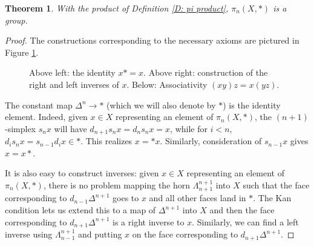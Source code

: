 \documentclass[12pt]{article}
\theoremstyle{plain}
\newtheorem{theorem}{Theorem}[section]
\theoremstyle{definition}
\theoremstyle{remark}
\begin{document}
\begin{theorem}
With the product of Definition \ref{D: pi product}, $\pi_n(X,*)$ is a group. 
\end{theorem}
\begin{proof}
The constructions corresponding to the necessary axioms are pictured in Figure \ref{F: fig27}.


\begin{figure}[!htp]
\begin{center}
\end{center}
\caption{Above left: the identity $x*=x$. Above right: construction of the right and left inverses of $x$. Below: Associativity $(xy)z=x(yz)$.}\label{F: fig27}
\end{figure}

The constant map $\Delta^n\to *$ (which we will also denote by $*$) is the identity element. Indeed, given $x\in X$ representing an element of $\pi_n(X,*)$, the $(n+1)$-simplex $s_{n}x$ will have $d_{n+1}s_nx=d_ns_nx=x$, while for $i<n$, $d_is_nx=s_{n-1}d_ix\in *$. This realizes $x=*x$. Similarly, consideration of $s_{n-1}x$  gives $x=x*$. 


It is also easy to construct inverses:  given $x\in X$ representing an element of $\pi_n(X,*)$, there is no problem mapping the horn $\Lambda^{n+1}_{n+1}$ into $X$ such that the face corresponding to $d_{n-1}\Delta^{n+1}$ goes to $x$ and all other faces land in $*$. The Kan condition lets us extend this to a map of $\Delta^{n+1}$ into $X$ and then the face corresponding to $d_{n+1}\Delta^{n+1}$ is a right inverse to $x$. Similarly, we can find a left inverse using $\Lambda^{n+1}_{n-1}$ and putting $x$ on the face corresponding to $d_{n+1}\Delta^{n+1}$. 


\end{proof}
\end{document}

